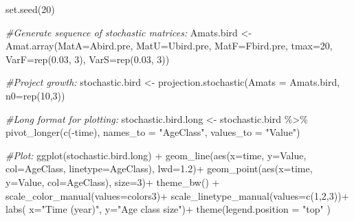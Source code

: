 \documentclass[
]{book}
\newenvironment{Shaded}{\begin{snugshade}}{\end{snugshade}}
\newcommand{\AttributeTok}[1]{\textcolor[rgb]{0.77,0.63,0.00}{#1}}
\newcommand{\CommentTok}[1]{\textcolor[rgb]{0.56,0.35,0.01}{\textit{#1}}}
\newcommand{\DecValTok}[1]{\textcolor[rgb]{0.00,0.00,0.81}{#1}}
\newcommand{\FloatTok}[1]{\textcolor[rgb]{0.00,0.00,0.81}{#1}}
\newcommand{\FunctionTok}[1]{\textcolor[rgb]{0.00,0.00,0.00}{#1}}
\newcommand{\NormalTok}[1]{#1}
\newcommand{\OtherTok}[1]{\textcolor[rgb]{0.56,0.35,0.01}{#1}}
\newcommand{\SpecialCharTok}[1]{\textcolor[rgb]{0.00,0.00,0.00}{#1}}
\newcommand{\StringTok}[1]{\textcolor[rgb]{0.31,0.60,0.02}{#1}}
\begin{document}
\begin{Shaded}
\begin{Highlighting}[]
\FunctionTok{set.seed}\NormalTok{(}\DecValTok{20}\NormalTok{)}

\CommentTok{\#Generate sequence of stochastic matrices:}
\NormalTok{Amats.bird }\OtherTok{\textless{}{-}} \FunctionTok{Amat.array}\NormalTok{(}\AttributeTok{MatA=}\NormalTok{Abird.pre, }
                         \AttributeTok{MatU=}\NormalTok{Ubird.pre, }
                         \AttributeTok{MatF=}\NormalTok{Fbird.pre, }
                         \AttributeTok{tmax=}\DecValTok{20}\NormalTok{, }
                         \AttributeTok{VarF=}\FunctionTok{rep}\NormalTok{(}\FloatTok{0.03}\NormalTok{, }\DecValTok{3}\NormalTok{), }
                         \AttributeTok{VarS=}\FunctionTok{rep}\NormalTok{(}\FloatTok{0.03}\NormalTok{, }\DecValTok{3}\NormalTok{)) }

\CommentTok{\#Project growth:}
\NormalTok{stochastic.bird }\OtherTok{\textless{}{-}} \FunctionTok{projection.stochastic}\NormalTok{(}\AttributeTok{Amats =}\NormalTok{ Amats.bird, }
                                         \AttributeTok{n0=}\FunctionTok{rep}\NormalTok{(}\DecValTok{10}\NormalTok{,}\DecValTok{3}\NormalTok{))}

\CommentTok{\#Long format for plotting:}
\NormalTok{stochastic.bird.long }\OtherTok{\textless{}{-}}\NormalTok{ stochastic.bird }\SpecialCharTok{\%\textgreater{}\%} \FunctionTok{pivot\_longer}\NormalTok{(}\FunctionTok{c}\NormalTok{(}\SpecialCharTok{{-}}\NormalTok{time),}
               \AttributeTok{names\_to =} \StringTok{"AgeClass"}\NormalTok{, }\AttributeTok{values\_to =} \StringTok{"Value"}\NormalTok{)}

\CommentTok{\#Plot:}
\FunctionTok{ggplot}\NormalTok{(stochastic.bird.long) }\SpecialCharTok{+} 
  \FunctionTok{geom\_line}\NormalTok{(}\FunctionTok{aes}\NormalTok{(}\AttributeTok{x=}\NormalTok{time, }\AttributeTok{y=}\NormalTok{Value, }\AttributeTok{col=}\NormalTok{AgeClass, }
                \AttributeTok{linetype=}\NormalTok{AgeClass), }\AttributeTok{lwd=}\FloatTok{1.2}\NormalTok{)}\SpecialCharTok{+}
  \FunctionTok{geom\_point}\NormalTok{(}\FunctionTok{aes}\NormalTok{(}\AttributeTok{x=}\NormalTok{time, }\AttributeTok{y=}\NormalTok{Value, }\AttributeTok{col=}\NormalTok{AgeClass), }\AttributeTok{size=}\DecValTok{3}\NormalTok{)}\SpecialCharTok{+}
  \FunctionTok{theme\_bw}\NormalTok{() }\SpecialCharTok{+}
  \FunctionTok{scale\_color\_manual}\NormalTok{(}\AttributeTok{values=}\NormalTok{colors3)}\SpecialCharTok{+} 
  \FunctionTok{scale\_linetype\_manual}\NormalTok{(}\AttributeTok{values=}\FunctionTok{c}\NormalTok{(}\DecValTok{1}\NormalTok{,}\DecValTok{2}\NormalTok{,}\DecValTok{3}\NormalTok{))}\SpecialCharTok{+}  
  \FunctionTok{labs}\NormalTok{( }\AttributeTok{x=}\StringTok{"Time (year)"}\NormalTok{, }\AttributeTok{y=}\StringTok{"Age class size"}\NormalTok{)}\SpecialCharTok{+}
  \FunctionTok{theme}\NormalTok{(}\AttributeTok{legend.position =} \StringTok{"top"}\NormalTok{ )}
\end{Highlighting}
\end{Shaded}
\end{document}
